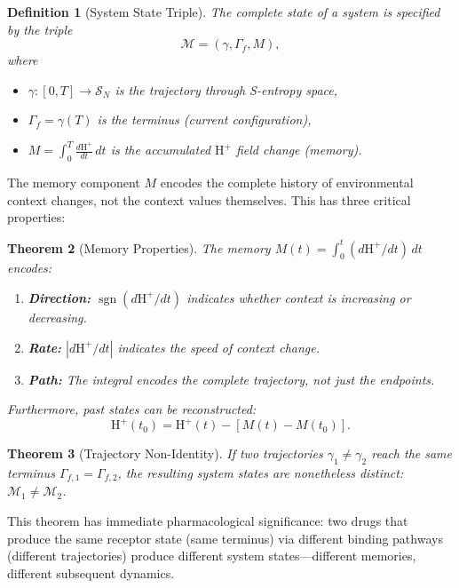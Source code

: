\documentclass[twocolumn,10pt]{article}
\newtheorem{theorem}{Theorem}[section]
\newtheorem{definition}[theorem]{Definition}
\newcommand{\Hplus}{\mathrm{H}^{+}}
\DeclareMathOperator{\sgn}{sgn}
\begin{document}
\begin{definition}[System State Triple]
\label{def:state_triple}
The complete state of a system is specified by the triple
\begin{equation}
  \mathcal{M} = (\gamma, \Gamma_{f}, M),
  \label{eq:state_triple}
\end{equation}
where
\begin{itemize}[nosep]
  \item $\gamma: [0, T] \to \mathcal{S}_{N}$ is the trajectory through S-entropy space,
  \item $\Gamma_{f} = \gamma(T)$ is the terminus (current configuration),
  \item $M = \int_{0}^{T} \frac{d\Hplus}{dt}\,dt$ is the accumulated $\Hplus$ field change (memory).
\end{itemize}
\end{definition}

The memory component $M$ encodes the complete history of environmental context changes, not the context values themselves.  This has three critical properties:

\begin{theorem}[Memory Properties]
\label{thm:memory}
The memory $M(t) = \int_{0}^{t} (d\Hplus/dt)\,dt$ encodes:
\begin{enumerate}[nosep]
  \item \textbf{Direction:} $\sgn(d\Hplus/dt)$ indicates whether context is increasing or decreasing.
  \item \textbf{Rate:} $|d\Hplus/dt|$ indicates the speed of context change.
  \item \textbf{Path:} The integral encodes the complete trajectory, not just the endpoints.
\end{enumerate}
Furthermore, past states can be reconstructed:
\begin{equation}
  \Hplus(t_{0}) = \Hplus(t) - [M(t) - M(t_{0})].
  \label{eq:retrieval}
\end{equation}
\end{theorem}

\begin{theorem}[Trajectory Non-Identity]
\label{thm:nonidentity}
If two trajectories $\gamma_{1} \neq \gamma_{2}$ reach the same terminus $\Gamma_{f,1} = \Gamma_{f,2}$, the resulting system states are nonetheless distinct: $\mathcal{M}_{1} \neq \mathcal{M}_{2}$.
\end{theorem}

This theorem has immediate pharmacological significance: two drugs that produce the same receptor state (same terminus) via different binding pathways (different trajectories) produce different system states---different memories, different subsequent dynamics.
\end{document}
